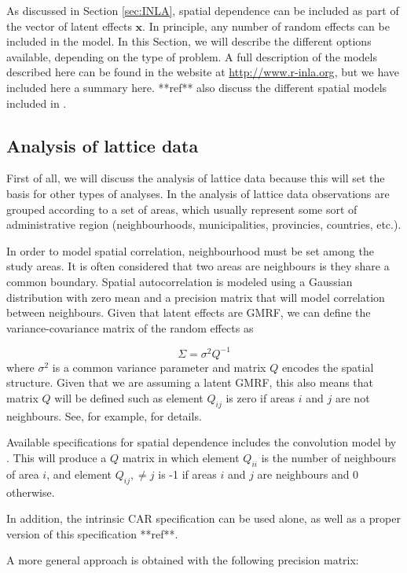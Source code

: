 \documentclass[article]{jss}
\begin{document}
As discussed in Section \ref{sec:INLA}, spatial dependence can be included
as part of the vector of latent effects $\mathbf{x}$. In principle,
any number of random effects can be included in the model. In this Section,
we will describe the different options available, depending on the type of 
problem. A full description of the models described here can be found 
in the  website at \url{http://www.r-inla.org}, but we have
included here a summary here. **ref** also discuss the different spatial
models included in .

\subsection{Analysis of lattice data}

First of all, we will discuss the analysis of lattice data because this will
set the basis for other types of analyses. In the analysis of lattice data
observations are grouped according to a set of areas, which usually represent
some sort of administrative region (neighbourhoods, municipalities, provincies,
countries, etc.).

In order to model spatial correlation, neighbourhood must be set among the
study areas.  It is often considered that two areas are neighbours is they
share a common boundary.  Spatial autocorrelation is modeled using a Gaussian
distribution with zero mean and a precision matrix that will model
correlation between neighbours. Given that latent effects are GMRF, 
we can define the variance-covariance matrix of the random effects
as

$$
\Sigma = \sigma^2 Q^{-1}
$$
\noindent
where $\sigma^2$ is a common variance parameter and matrix $Q$ encodes
the spatial structure. Given that we are assuming a latent GMRF, this also
means that matrix $Q$ will be defined such as element $Q_{ij}$ is zero if
areas $i$ and $j$ are not neighbours. See, for example, \citet{rueheld:2005} 
for details.


Available specifications for spatial dependence includes the convolution model
by \citet{besagetal:1991}. This will produce a $Q$ matrix in which element
$Q_{ii}$ is the number of neighbours of area $i$, and element $Q_{ij},\neq j$
is -1 if areas $i$ and $j$ are neighbours and 0 otherwise.

In addition, the intrinsic CAR specification
can be used alone, as well as a proper version of this specification **ref**.


A more general approach is obtained  with the following precision
matrix:
\end{document}
